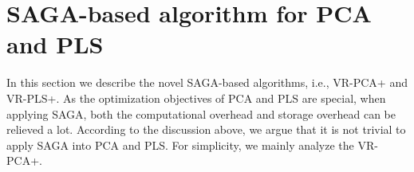 \documentclass[runningheads,a4paper]{llncs}
\begin{document}
 
  
 
 


 
 

 
 
 \section{SAGA-based algorithm for PCA and PLS}
 \label{SAGA-based}
In this section we describe the novel SAGA-based algorithms, i.e., VR-PCA+ and VR-PLS+.
 As the optimization objectives  of PCA and PLS are special, when applying SAGA, both the computational overhead and storage overhead can be relieved a lot. 
 According to the discussion above, we argue that it is not trivial to apply SAGA into PCA and PLS. For simplicity, we mainly analyze the VR-PCA+.
 
\end{document}
